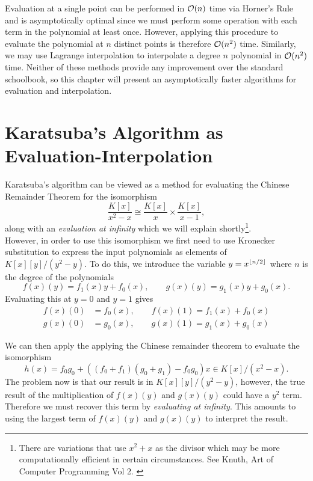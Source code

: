 \medskip

Evaluation at a single point can be performed in $\mathcal O(n)$ time via Horner's Rule and is asymptotically optimal since we must perform some operation with each term in the polynomial at least once. However, applying this procedure to evaluate the polynomial at $n$ distinct points is therefore $\mathcal O(n^2)$ time. Similarly, we may use Lagrange interpolation to interpolate a degree $n$ polynomial in $\mathcal O(n^2)$ time. Neither of these methods provide any improvement over the standard schoolbook, so this chapter will present an asymptotically faster algorithms for evaluation and interpolation.

\section{Karatsuba's Algorithm as Evaluation-Interpolation}%
\label{sec:Karatsuba's Algorithms as Evaluation-Interpolation}

Karatsuba's algorithm can be viewed as a method for evaluating the Chinese Remainder Theorem for the isomorphism
\[
    \frac{K[x]}{x^2 - x} \cong \frac{K[x]}{x} \times \frac{K[x]}{x-1},
\]
along with an \emph{evaluation at infinity} which we will explain shortly\footnote{There are variations that use $x^2 + x$ as the divisor which may be more computationally efficient in certain circumstances. See Knuth, Art of Computer Programming Vol 2. \cite{knuthv2}}.\\
However, in order to use this isomorphism we first need to use Kronecker substitution to express the input polynomials as elements of $K[x][y]/(y^2 - y)$. To do this, we introduce the variable $y = x^{\left \lfloor n/2 \right \rfloor}$ where $n$ is the degree of the polynomials
\[
    f(x)(y) = f_1(x)y + f_0(x), \qquad g(x)(y) = g_1(x)y + g_0(x).
\]
Evaluating this at $y = 0$ and $y = 1$ gives
\begin{align*}
    f(x)(0) &= f_0(x), \qquad f(x)(1) = f_1(x) + f_0(x)\\
    g(x)(0) &= g_0(x), \qquad g(x)(1) = g_1(x) + g_0(x)
\end{align*}

We can then apply the applying the Chinese remainder theorem to evaluate the isomorphism
\begin{equation}\label{eq:karatsuba-crt}
    h(x) = f_0g_0 + ((f_0 + f_1)(g_0 + g_1) - f_0g_0)x \in K[x]/(x^2 - x).
\end{equation}
The problem now is that our result is in $K[x][y]/(y^2 - y)$, however, the true result of the multiplication of $f(x)(y)$ and $g(x)(y)$ could have a $y^2$ term. Therefore we must recover this term by \emph{evaluating at infinity}. This amounts to using the largest term of $f(x)(y)$ and $g(x)(y)$ to interpret the result.

